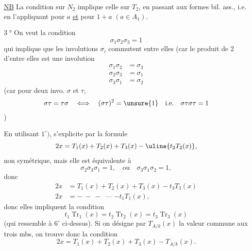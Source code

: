 \uline{NB} La condition sur $N_2$ implique celle sur $T_2$, en passant aux formes bil. ass., i.e. en l'appliquant pour $a$ \uline{et} pour $1+a$ $(a\in A_1)$.

\textcircled{3°} On veut la condition
\[
 \boxed{\sigma_1\sigma_2\sigma_3=1}
\]
qui implique que les involutions $\sigma_i$ commutent entre elles (car le produit de 2 d'entre elles est une involution
\[
 \boxed{\begin{aligned}
 \sigma_1\sigma_2&=\sigma_3\\
 \sigma_2\sigma_3&=\sigma_1\\
 \sigma_3\sigma_1&=\sigma_2
 \end{aligned}}
\]
(car pour deux invo. $\sigma$ et $\tau$,
\[
 \sigma\tau=\tau\sigma\quad\Longleftrightarrow\quad(\sigma\tau)^2=\unsure{1}\quad\text{i.e.}\quad\sigma\tau\sigma\tau=1
\]
)

En utilisant $1^\circ)$,   s'explicite par la formule
\[
 2x=T_1(x)+T_2(x)+T_3(x)-\uline{t_2T_2(x)},
\]
non symétrique, mais elle est équivalente à
\[
 \sigma_2\sigma_3\sigma_1=1,\quad\text{ou}\quad\sigma_3\sigma_1\sigma_2=1,
\]
donc
\[
 \begin{aligned}
 2x&=T_1(x)+T_2(x)+T_3(x)-t_3T_3(x)\\
 2x&=\mathbin{-}\ \mathbin{-}\ \mathbin{-}\ \mathbin{\text{---}}-t_1T_1(x),
 \end{aligned}
\]
donc elles impliquent\unsure{*} la condition
\[
 \boxed{t_1\operatorname{Tr}_1(x)=t_2\operatorname{Tr}_2(x)=t_3\operatorname{Tr}_3(x)}
\]
(qui ressemble à $6^\circ$ ci-dessus). Si on désigne par $T_{A/k}(x)$ la valeur commune aux trois mbs, on trouve donc la condition
\[
 \boxed{2x=T_1(x)+T_2(x)+T_3(x)-T_{A/k}(x).}
\]
